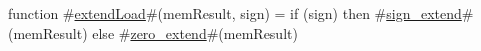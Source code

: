 function #\hyperref[zextendLoad]{extendLoad}#(memResult, sign) = {
  if (sign) then
    #\hyperref[zsignzyextend]{sign\_extend}#(memResult)
  else
    #\hyperref[zzzerozyextend]{zero\_extend}#(memResult)
}
